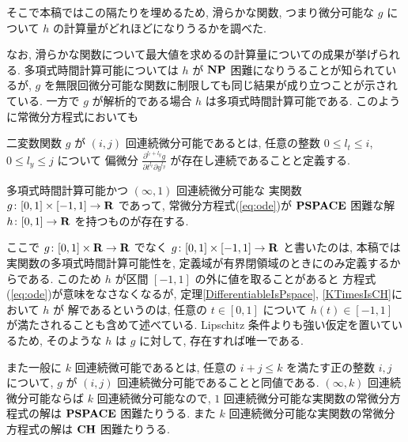 そこで本稿ではこの隔たりを埋めるため, 滑らかな関数, 
つまり微分可能な $g$ について $h$ の計算量がどれほどになりうるかを調べた.

なお, 滑らかな関数について最大値を求めるの計算量についての成果が挙げられる.
多項式時間計算可能については
$h$ が $\mathbf{NP}$ 困難になりうることが知られているが,
$g$ を無限回微分可能な関数に制限しても同じ結果が成り立つことが示されている.
一方で $g$ が解析的である場合 $h$ は多項式時間計算可能である.
このように常微分方程式においても

二変数関数 $g$ が $(i, j)$ 回連続微分可能であるとは,
任意の整数 $0 \le l_t \le i$, $0 \le l_y \le j$ について
偏微分 $\displaystyle \frac{\partial^{l_t+l_y}g}{\partial t^{l_t} \partial y^{l_y}}$
が存在し連続であることと定義する.


 \begin{theorem}
  \label{DifferentiableIsPspace}
  多項式時間計算可能かつ $(\infty, 1)$ 回連続微分可能な
  実関数 $g \colon [0,1] \times [-1,1] \to \mathbf R$ であって, 
  常微分方程式(\ref{eq:ode})が
  $\mathbf{PSPACE}$ 困難な解 $h \colon [0, 1] \to \mathbf R$ を持つものが存在する.
 \end{theorem}

ここで $g \colon [0,1] \times \mathbf R \to \mathbf R$ でなく
$g \colon [0,1] \times [-1, 1] \to \mathbf R$ と書いたのは, 
本稿では実関数の多項式時間計算可能性を, 
定義域が有界閉領域のときにのみ定義するからである. 
このため $h$ が区間 $[-1, 1]$ の外に値を取ることがあると
方程式(\ref{eq:ode})が意味をなさなくなるが, 
定理\ref{DifferentiableIsPspace}, \ref{KTimesIsCH}において $h$ が
解であるというのは, 
任意の $t \in [0, 1]$ について $h (t) \in [-1, 1]$ が満たされることも含めて述べている.
Lipschitz 条件よりも強い仮定を置いているため, 
そのような $h$ は $g$ に対して, 存在すれば唯一である. 

また一般に $k$ 回連続微可能であるとは, 
任意の $i+j \le k$ を満たす正の整数 $i,j$ について,
$g$ が $(i,j)$ 回連続微分可能であることと同値である.
$(\infty, k)$ 回連続微分可能ならば $k$ 回連続微分可能なので,
$1$ 回連続微分可能な実関数の常微分方程式の解は $\mathbf{PSPACE}$ 困難たりうる.
また $k$ 回連続微分可能な実関数の常微分方程式の解は $\mathbf{CH}$ 困難たりうる.

